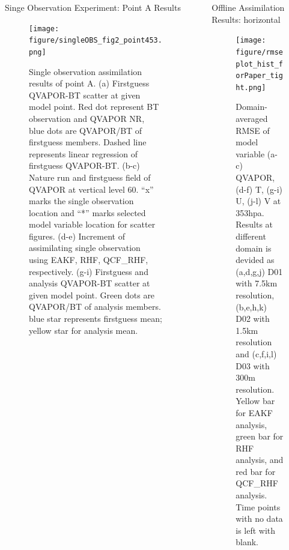 \documentclass[final]{beamer}
\newlength{\sepwidth}
\newlength{\colwidth}
\newcommand{\separatorcolumn}{\begin{column}{\sepwidth}\end{column}}
\begin{document}
\begin{frame}[t]
\begin{columns}[t]
\begin{column}{\colwidth}
\begin{block}{Singe Observation Experiment: Point A Results}
\begin{itemize}
				\end{itemize}
 
                \begin{figure}
                    \centerline{\texttt{[image: figure/singleOBS\_fig2\_point453.png]}}
                    \caption{Single observation assimilation results of point A. (a) Firstguess QVAPOR-BT scatter at given model point. Red dot represent BT observation and QVAPOR NR, blue dots are QVAPOR/BT of firstguess members. Dashed line represents linear regression of firstguess QVAPOR-BT. (b-c) Nature run and firstguess field of QVAPOR at vertical level 60.  “x” marks the single observation location and “*” marks selected model variable location for scatter figures. (d-e) Increment of assimilating single observation using EAKF, RHF, QCF\_RHF, respectively. (g-i) Firstguess and analysis QVAPOR-BT scatter at given model point. Green dots are QVAPOR/BT of analysis members. blue star represents firstguess mean; yellow star for analysis mean.}\label{fig2}
                \end{figure}

				
			
				
			\end{block}
			
		\end{column}
	
		\separatorcolumn
		\begin{column}{\colwidth}
			\begin{block}{Offline Assimilation Results: horizontal}

    
				\begin{figure}
                    {\texttt{[image: figure/rmseplot\_hist\_forPaper\_tight.png]}}
                    \caption{Domain-averaged RMSE of model variable (a-c) QVAPOR, (d-f) T, (g-i) U, (j-l) V at 353hpa. Results at different domain is devided as (a,d,g,j) D01 with 7.5km resolution, (b,e,h,k) D02 with 1.5km resolution and (c,f,i,l) D03 with 300m resolution. Yellow bar for EAKF analysis, green bar for RHF analysis, and red bar for QCF\_RHF analysis. Time points with no data is left with blank.}\label{rmse_horizontal}
                \end{figure}


\end{block}
\end{column}
\end{columns}
\end{frame}
\end{document}
